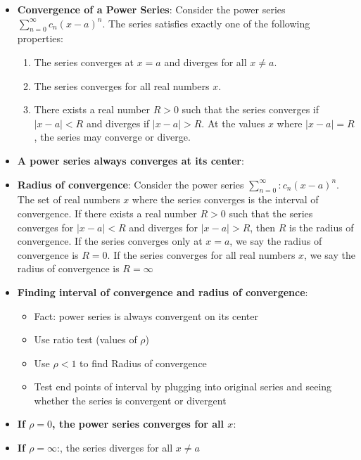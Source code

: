 \documentclass{report}
\begin{document}
\begin{itemize}
        \item \textbf{Convergence of a Power Series}:
            \bigbreak \noindent 
            Consider the power series \(\sum_{n=0}^{\infty} c_n (x - a)^n\). The series satisfies exactly one of the following properties:
            \begin{enumerate}[label=(\roman*)]
                \item The series converges at \( x = a \) and diverges for all \( x \neq a \).
                \item The series converges for all real numbers \( x \).
                \item There exists a real number \( R > 0 \) such that the series converges if \( |x - a| < R \) and diverges if \( |x - a| > R \). At the values \( x \) where \( |x - a| = R \), the series may converge or diverge.
            \end{enumerate}
        \item \textbf{A power series always converges at its center}:
        \item \textbf{Radius of convergence}:         Consider the power series \(\sum_{n=0}^{\infty}: c_n (x - a)^n\). The set of real numbers \( x \) where the series converges is the interval of convergence. If there exists a real number \( R > 0 \) such that the series converges for \( |x - a| < R \) and diverges for \( |x - a| > R \), then \( R \) is the radius of convergence. If the series converges only at \( x = a \), we say the radius of convergence is \( R = 0 \). If the series converges for all real numbers \( x \), we say the radius of convergence is \( R = \infty \) 
        \item \textbf{Finding interval of convergence and radius of convergence}:
            \begin{itemize}
                \item Fact: power series is always convergent on its center
                \item Use ratio test (values of $\rho$) 
                \item Use $\rho < 1$ to find Radius of convergence
                \item Test end points of interval by plugging into original series and seeing whether the series is convergent or divergent
            \end{itemize}
        \item \textbf{If $\rho = 0$, the power series converges for all $x$}:
        \item \textbf{If $\rho = \infty$}:, the series diverges for all $x \neq a$ 

\end{itemize}
\end{document}
